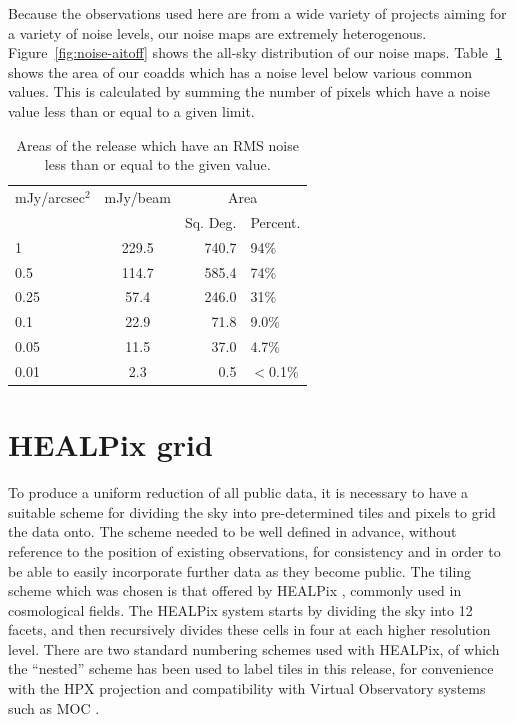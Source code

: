 \documentclass[usenatbib]{mnras}
\begin{document}
Because the observations used here are from a wide variety of projects
aiming for a variety of noise levels, our noise maps are extremely
heterogenous. Figure~\ref{fig:noise-aitoff} shows the all-sky
distribution of our noise maps. Table~\ref{tab:noises} shows the area
of our coadds which has a noise level below various common
values. This is calculated by summing the number of
pixels which have a noise value less than or equal to a given limit.


\begin{table}
\centering
\begin{tabular}{l c r l}
  \hline
  mJy/arcsec$^{2}$& mJy/beam  & \multicolumn{2}{c}{Area}\\
                &          &  Sq. Deg. & Percent. \\
  \hline
  1  & 229.5& 740.7 & 94\% \\
  0.5  & 114.7& 585.4 & 74\% \\
  0.25  & 57.4& 246.0 & 31\%\\
  0.1 & 22.9& 71.8 & 9.0\%\\
  0.05 & 11.5& 37.0 & 4.7\%\\
  0.01 &2.3 & 0.5 & $<$0.1\%\\
  \hline
\end{tabular}
\caption{Areas of the release which have an RMS noise less than or equal to the given value. \label{tab:noises}}
\end{table}








\section{HEALPix grid }

To produce a uniform reduction of all public data, it is necessary to have
a suitable scheme for dividing the sky into pre-determined tiles and
pixels to grid the data onto.  The scheme needed to be well defined in
advance, without reference to the position of existing observations,
for consistency and in order to be able to easily incorporate further
data as they become public.  The tiling scheme which was chosen is
that offered by HEALPix \citep[Hierarchical Equal Area isoLatitude
Pixelization,][]{Gorski2005}, commonly used in cosmological fields.
The HEALPix system starts by dividing the sky into 12 facets, and then
recursively divides these cells in four at each higher resolution
level.  There are two standard numbering schemes used with HEALPix, of
which the ``nested'' scheme has been used to label tiles in this
release, for convenience with the HPX projection and compatibility with
Virtual Observatory systems such as MOC \citep[Multi-Order
Coverage,][]{2013ASPC..475..135F}.
\end{document}
